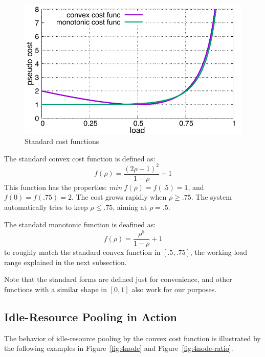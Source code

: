 \begin{figure}[tb]
  \begin{center}
    \includegraphics[width=1.0\columnwidth]{costfunc.pdf}
    \vspace{-2.0ex}
    \caption{Standard cost functions}
    \label{fig:std_costfunc}
  \end{center}
\end{figure}

The standard convex cost function is defined as:
\begin{equation*}
	f(\rho) = \frac{(2\rho - 1)^{2}}{1 - \rho} + 1
\end{equation*}
This function has the properties:
$min\: f(\rho) = f(.5) = 1$, and $f(0) = f(.75) = 2$.
The cost grows rapidly when $\rho \ge .75$.
The system automatically tries to keep $\rho \le .75$,
aiming at $\rho = .5$.

The standatd monotonic function is deafined as:
\begin{equation*}
	f(\rho) = \frac{\rho^{5}}{1 - \rho} + 1
\end{equation*}
to roughly match the standard convex function in $[.5, .75]$,
the working load range explained in the next subsection.

Note that the standard forms are defined just for convenience, and
other functions with a similar shape in $[0,1]$ also work for our
purposes.

\subsection{Idle-Resource Pooling in Action}

The behavior of idle-resource pooling by the convex cost function is
illustrated by the following examples in Figure~\ref{fig:4node} and
Figure~\ref{fig:4node-ratio}.

